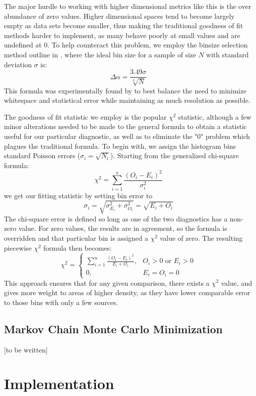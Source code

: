 \documentclass[twocolumn,letterpaper,10pt]{article}
\begin{document}
The major hurdle to working with higher dimensional metrics like this is the over abundance of zero values. Higher dimensional spaces tend to become largely empty as data sets become smaller, thus making the traditional goodness of fit methods harder to implement, as many behave poorly at small values and are undefined at 0. To help counteract this problem, we employ the binsize selection method outline in \citet{binsize}, where the ideal bin size for a sample of size $N$ with standard deviation $\sigma$ is: 
$$
\Delta \alpha=\frac{3.49\sigma}{\sqrt[3]{N}}$$
 This formula was experimentally found by \citet{binsize} to best balance the need to minimize whitespace and statistical error while maintaining as much resolution as possible.

The goodness of fit statistic we employ is the popular $\chi^2$ statistic, although a few minor alterations needed to be made to the general formula to obtain a statistic useful for our particular diagnostic, as well as to eliminate the "0" problem which plagues the traditional formula. To begin with, we assign the histogram bins standard Poisson errors ($\sigma_i=\sqrt{N_i}$). Starting from the generalized chi-square formula:
$$
\chi^2=\sum\limits_{i=1}^n \frac{(O_i-E_i)^2}{\sigma_i^2}
$$
we get our fitting statistic by setting bin error to 
$$
\sigma_i=\sqrt{\sigma_{E_i}^2+\sigma_{O_i}^2}=\sqrt{E_i+O_i}
$$ 
The chi-square error is defined so long as one of the two diagnostics has a non-zero value. For zero values, the results are in agreement, so the formula is overridden and that particular bin is assigned a $\chi^2$ value of zero. The resulting piecewise $\chi^2$ formula then becomes:
$$
\chi^2=
\begin{cases}
\sum\limits_{i=1}^n \frac{(O_i-E_i)^2}{E_i+O_i}, & O_i > 0 \text{ or } E_i > 0 \\
0, & E_i=O_i=0
\end{cases}
$$
This approach ensures that for any given comparison, there exists a $\chi^2$ value, and gives more weight to areas of higher density, as they have lower comparable error to those bins with only a few sources.

\subsection{Markov Chain Monte Carlo Minimization}

[to be written]

\section{Implementation}
\end{document}
